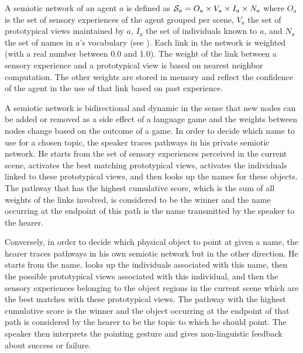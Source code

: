 A semiotic network of an agent $a$ is defined as 
${\cal S}_a = O_a \times V_a \times I_a \times N_a$ where $O_a$ is the set of
sensory experiences of the agent grouped per scene, $V_a$ the set of
prototypical views maintained by $a$, $I_a$ the set of individuals
 known to $a$, and $N_a$ the set of names in $a$'s vocabulary
(see 
). Each link in the network is weighted (with a real number between 0.0 and 1.0). The
weight of the link between a sensory experience and a prototypical
view is based on nearest neighbor computation. The other weights are
stored in memory and reflect the confidence of the agent in the use of
that link based on past experience. 

A semiotic network  is bidirectional and dynamic in the sense that new nodes can be added or
removed as a side effect of a language game and the weights between
nodes change based on the outcome of a game. In
order to decide which name to use for a chosen topic, the speaker
traces pathways in his private semiotic network. He starts from the
set of sensory experiences perceived in the current scene, activates
the best matching prototypical views, activates the individuals
linked to these prototypical views, and then looks up the names for
these objects. The pathway that has the highest cumulative score,
which is the sum of all weights of the links involved, is considered
to be the winner and the name occurring at the endpoint of this path
is the name transmitted by the speaker to the hearer. 

Conversely, in order to decide which physical object to point at given a name, the hearer
traces pathways in his own semiotic network but in the other
direction. He starts from the name, looks up the individuals
associated with this name, then the possible prototypical views
associated with this individual, and then the sensory
experiences belonging to the object regions in the current scene which
are the best matches with these prototypical views. The pathway with
the highest cumulative score is the winner and the object occurring at
the endpoint of that path is considered by the hearer to be the topic
to which he should point. The speaker then interprets the pointing
gesture and gives non-linguistic feedback about success or failure.

